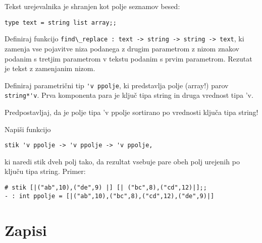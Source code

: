 \begin{ex}
  Tekst urejevalnika je shranjen kot polje seznamov besed:

\begin{lstlisting}
type text = string list array;;
\end{lstlisting}
  
  Definiraj funkcijo \lstinline{find\_replace : text -> string -> string -> text},
  ki zamenja vse pojavitve niza podanega z drugim parametrom z nizom
  znakov podanim s tretjim parametrom v tekstu podanim s prvim
  parametrom. Rezutat je tekst z zamenjanim nizom.


\end{ex} 
\begin{ex}
Definiraj parametri\v cni tip 
\lstinline{'v ppolje}, ki predstavlja polje (array!) parov
\lstinline{string*'v}. Prva komponenta para je klju\v c tipa string in druga vrednost tipa 'v.

Predpostavljaj, da je polje tipa 'v ppolje sortirano po vrednosti klju\v ca tipa string!  

Napi\v si funkcijo
\begin{lstlisting}
stik 'v ppolje -> 'v ppolje -> 'v ppolje, 
\end{lstlisting}
ki naredi stik dveh polj tako, da rezultat vsebuje pare obeh polj urejenih po klju\v cu tipa string. 
Primer:

\begin{lstlisting}
# stik [|("ab",10),("de",9) |] [| ("bc",8),("cd",12)|];;
- : int ppolje = [|("ab",10),("bc",8),("cd",12),("de",9)|]

\end{lstlisting}

\end{ex} 

\section{Zapisi}

